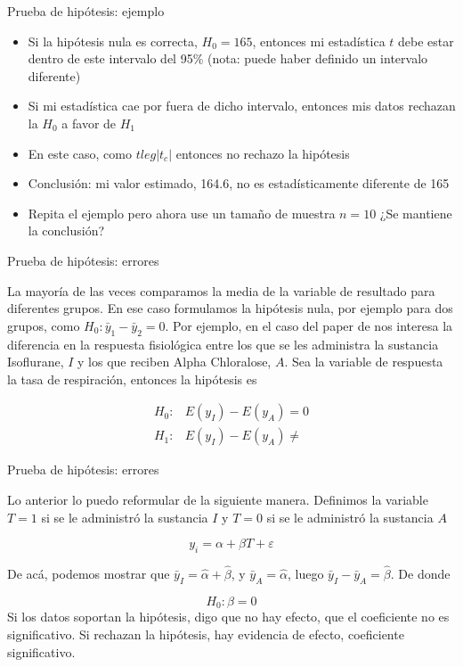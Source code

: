 \documentclass{beamer}
\begin{document}
\begin{frame}{Prueba de hipótesis: ejemplo}

\begin{itemize}
    \item Si la hipótesis nula es correcta, $H_0=165$, entonces mi estadística $t$ debe estar dentro de este intervalo del 95\% (nota: puede haber definido un intervalo diferente)
    \item Si mi estadística cae por fuera de dicho intervalo, entonces mis datos rechazan la $H_0$ a favor de $H_1$
    \item En este caso, como $t leg|t_c|$ entonces no rechazo la hipótesis
    \item Conclusión: mi valor estimado, 164.6, no es estadísticamente diferente de 165
    \item Repita el ejemplo pero ahora use un tamaño de muestra $n=10$ ¿Se mantiene la conclusión?
\end{itemize}
    
\end{frame}

\begin{frame}{Prueba de hipótesis: errores}

La mayoría de las veces comparamos la media de la variable de resultado para diferentes grupos. En ese caso formulamos la hipótesis nula, por ejemplo para dos grupos, como $H_0: \bar{y}_1-\bar{y}_2=0$. Por ejemplo, en el caso del paper de \cite{low_mouse} nos interesa la diferencia en la respuesta fisiológica entre los que se les administra la sustancia Isoflurane, $I$ y los que reciben Alpha Chloralose, $A$. Sea la variable de respuesta la tasa de respiración, entonces la hipótesis es

\begin{align*}
    H_0:& E(y_I)-E(y_A)=0\\
    H_1:& E(y_I)-E(y_A)\neq
\end{align*}
    
\end{frame}

\begin{frame}{Prueba de hipótesis: errores}

Lo anterior lo puedo reformular de la siguiente manera. Definimos la variable $T=1$ si se le administró la sustancia $I$ y $T=0$ si se le administró la sustancia $A$

\begin{equation*}
    y_i=\alpha+\beta T+ \varepsilon
\end{equation*}

De acá, podemos mostrar que $\bar{y}_I=\hat{\alpha}+\hat{\beta}$,  y $\bar{y}_A=\hat{\alpha}$, luego $\bar{y}_I-\bar{y}_A=\hat{\beta}$. De donde

\begin{equation*}
    H_0:\beta=0
\end{equation*}
    Si los datos soportan la hipótesis, digo que no hay efecto, que el coeficiente no es significativo. Si rechazan la hipótesis, hay evidencia de efecto, coeficiente significativo.
\end{frame}
\end{document}

